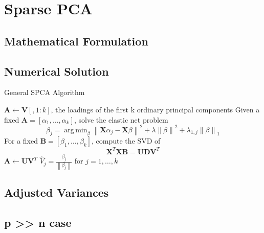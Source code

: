 \documentclass{beamer}
\newcommand{\mat}[1]{\mathbf{#1}}
\DeclareMathOperator*{\argmin}{arg\,min}
\newcommand{\norm}[1]{\left\lVert #1 \right\rVert}
\begin{document}

\section{Sparse PCA}

\subsection{Mathematical Formulation}
\subsection{Numerical Solution}

\begin{frame}
\begin{algorithm}[H]
  \scriptsize
    \caption{General SPCA Algorithm}
    \begin{algorithmic}[1]
        	\State $\mat A \gets \mat V[,1 \colon k]$, the loadings of the first k ordinary principal components
             
                \State Given a fixed $\mat A = [\alpha_1, \ldots, \alpha_k]$, solve the elastic net problem $$\beta_j = \argmin_{\beta} \norm{\mat X \alpha_j - \mat X \beta}^{2} + \lambda \norm{\beta}^2 + \lambda_{1,j}\norm{\beta}_{1}$$
                \State For a fixed $\mat B = [\beta_1, \ldots, \beta_k]$, compute the SVD of $$\mat X^T \mat X \mat B = \mat U \mat D \mat V^T$$
                \State $\mat A \gets \mat U \mat V^T$
            \EndWhile
            \State $\hat{V}_j = \frac{\beta_j}{\norm{\beta_j}}$ for $j = 1, \ldots, k$
        \EndProcedure
    \end{algorithmic}
\end{algorithm} 
\end{frame}

\subsection{Adjusted Variances}
\subsection{p >> n case}

\end{document}
